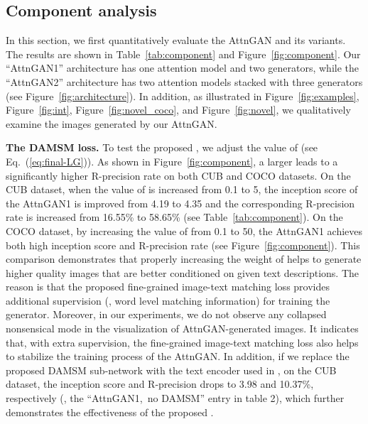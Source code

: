 \documentclass[10pt,twocolumn,letterpaper]{article}
\begin{document}
\subsection{Component analysis} \label{sec:component}
\vspace{-5pt}
In this section, we first quantitatively evaluate the AttnGAN and its variants.  The results are shown in Table~\ref{tab:component} and Figure~\ref{fig:component}. Our ``AttnGAN1'' architecture has one attention model and two generators, while the ``AttnGAN2'' architecture has two attention models stacked with three generators (see Figure~\ref{fig:architecture}). In addition, as illustrated in Figure~\ref{fig:examples}, Figure~\ref{fig:int}, Figure~\ref{fig:novel_coco}, and Figure~\ref{fig:novel}, we qualitatively examine the images generated by our AttnGAN. 


\textbf{The DAMSM loss. }{
To test the proposed , we adjust the value of  (see Eq.~(\ref{eq:final-LG})).
As shown in Figure~\ref{fig:component}, a larger  leads to a significantly higher R-precision rate on both CUB and COCO datasets. On the CUB dataset, when the value of  is increased from 0.1 to 5, the inception score of the AttnGAN1 is improved from 4.19 to 4.35 and the corresponding R-precision rate is increased from 16.55\% to 58.65\% (see Table~\ref{tab:component}). On the COCO dataset, by increasing the value of  from 0.1 to 50, the AttnGAN1 achieves both high inception score and R-precision rate  (see Figure~\ref{fig:component}). This comparison demonstrates that properly increasing the weight of  helps to generate higher quality images that are better conditioned on given text descriptions. The reason is that the proposed fine-grained image-text matching loss  provides additional supervision (\ie, word level matching information) for training the generator. Moreover, in our experiments, we do not observe any collapsed nonsensical mode in the visualization of AttnGAN-generated images. It indicates that, with extra supervision, the fine-grained image-text matching loss also helps to stabilize the training process of the AttnGAN. In addition, if we replace the proposed DAMSM sub-network with the text encoder used in \cite{reed2016cvpr}, on the CUB dataset, the inception score and R-precision drops to 3.98 and 10.37\%, respectively (\ie, the ``AttnGAN1,~no DAMSM'' entry in table 2), which further demonstrates the effectiveness of the proposed . 
}
\end{document}
